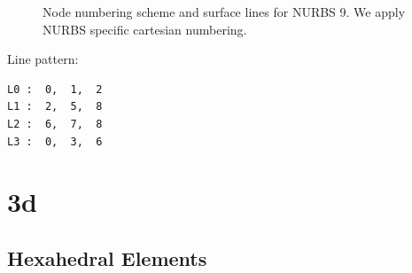 \begin{figure}[h!]
\begin{center}
\caption{Node numbering scheme and surface lines for NURBS 9. We apply NURBS specific cartesian numbering.}
\label{fig:conventions:2d}
\end{center}
\end{figure}

Line pattern:
\begin{verbatim}
L0 :  0,  1,  2
L1 :  2,  5,  8
L2 :  6,  7,  8
L3 :  0,  3,  6
\end{verbatim}



\newpage
\section{3d}
\subsection{Hexahedral Elements}

